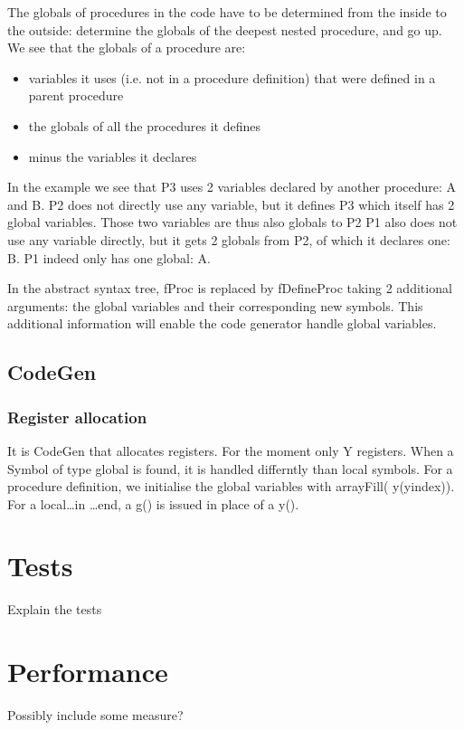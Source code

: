\documentclass[draft,a4paper]{memoir}
\begin{document}
The globals of procedures in the code have to be determined from the inside to the outside: determine the globals of the deepest nested procedure, and go up. 
We see that the globals of a procedure are:
\begin{itemize}
  \item variables it uses (i.e. not in a procedure definition) that were defined in a parent procedure
  \item the globals of all the procedures it defines
  \item minus the variables it declares
\end{itemize}
In the example we see that P3 uses 2 variables declared by another procedure: A and B. 
P2 does not directly use any variable, but it defines P3 which itself has 2 global variables. Those two variables are thus also globals to P2
P1 also does not use any variable directly, but it gets 2 globals from P2, of which it declares one: B. P1 indeed only has one global: A.

In the abstract syntax tree, fProc is replaced by fDefineProc taking 2 additional arguments: the global variables and their corresponding new symbols. This additional information will enable the code generator handle global variables. 
\subsection{CodeGen}
\subsubsection{Register allocation}
It is CodeGen that allocates registers. For the moment only Y registers.
When a Symbol of type global is found, it is handled differntly than local symbols.
For a procedure definition, we initialise the global variables with arrayFill( y(yindex)). 
For a local\ldots in \ldots end, a g() is issued in place of a y(). 

\section{Tests}
Explain the tests

\section{Performance}
Possibly include some measure?
\end{document}
